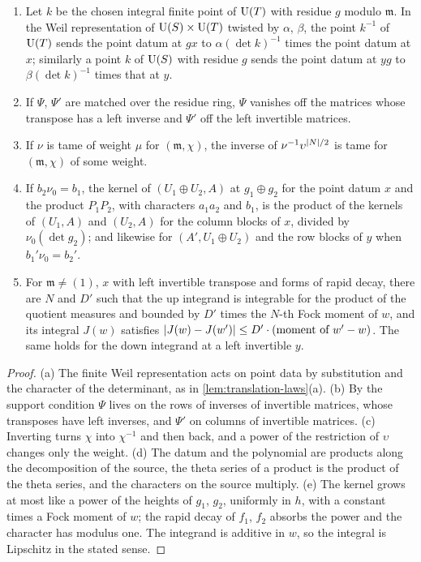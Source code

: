 \begin{lemma}\label{lem:point-data}
\begin{enumerate}[label=\textup{(\alph*)}]
\item Let $k$ be the chosen integral finite point of $\operatorname{U}(T)$ with residue $g$ modulo $\mathfrak m$. In the Weil representation of $\operatorname{U}(S)\times\operatorname{U}(T)$ twisted by $\alpha$, $\beta$, the point $k^{-1}$ of $\operatorname{U}(T)$ sends the point
datum at $gx$ to $\alpha(\det k)^{-1}$ times the point datum at $x$; similarly a point $k$ of $\operatorname{U}(S)$ with residue $g$ sends the point datum at $yg$ to $\beta(\det k)^{-1}$ times that at $y$.
\item If $\Psi$, $\Psi'$ are matched over the residue ring, $\Psi$ vanishes off the matrices whose transpose has a left inverse and $\Psi'$ off the left invertible matrices.
\item If $\nu$ is tame of weight $\mu$ for $(\mathfrak m,\chi)$, the inverse of $\nu^{-1}\upsilon^{\lvert N\rvert/2}$ is tame for $(\mathfrak m,\chi)$ of some weight.
\item If $b_2\nu_0=b_1$, the kernel of $(U_1\oplus U_2,A)$ at $g_1\oplus g_2$ for the point datum $x$ and the product $P_1P_2$, with characters $a_1a_2$ and $b_1$, is the product of the kernels of $(U_1,A)$ and
$(U_2,A)$ for the column blocks of $x$, divided by $\nu_0(\det g_2)$; and likewise for $(A',U_1\oplus U_2)$ and the row blocks of $y$ when $b_1'\nu_0=b_2'$.
\item For $\mathfrak m\ne(1)$, $x$ with left invertible transpose and forms of rapid decay, there are $N$ and $D'$ such that the up integrand is integrable for the product of the quotient measures and bounded by $D'$
times the $N$-th Fock moment of $w$, and its integral $J(w)$ satisfies $\lvert J(w)-J(w')\rvert\le D'\cdot(\text{moment of }w'-w)$. The same holds for the down integrand at a left invertible $y$.
\end{enumerate}
\end{lemma}

\begin{proof}
(a) The finite Weil representation acts on point data by substitution and the character of the determinant, as in \cref{lem:translation-laws}(a). (b) By the support condition $\Psi$ lives on the rows of inverses of
invertible matrices, whose transposes have left inverses, and $\Psi'$ on columns of invertible matrices. (c) Inverting turns $\chi$ into $\chi^{-1}$ and then back, and a power of the restriction of $\upsilon$ changes only the
weight. (d) The datum and the polynomial are products along the decomposition of the source, the theta series of a product is the product of the theta series, and the characters on the source multiply. (e) The
kernel grows at most like a power of the heights of $g_1$, $g_2$, uniformly in $h$, with a constant times a Fock moment of $w$; the rapid decay of $f_1$, $f_2$ absorbs the power and the character has modulus one.
The integrand is additive in $w$, so the integral is Lipschitz in the stated sense.
\end{proof}

